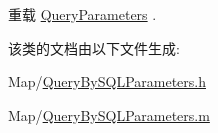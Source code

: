 重载 \hyperlink{interface_query_parameters_ab34003baea3fb15a37fc89bff33304c3}{Query\-Parameters} .



该类的文档由以下文件生成\-:\begin{DoxyCompactItemize}
\item 
Map/\hyperlink{_query_by_s_q_l_parameters_8h}{Query\-By\-S\-Q\-L\-Parameters.\-h}\item 
Map/\hyperlink{_query_by_s_q_l_parameters_8m}{Query\-By\-S\-Q\-L\-Parameters.\-m}\end{DoxyCompactItemize}
